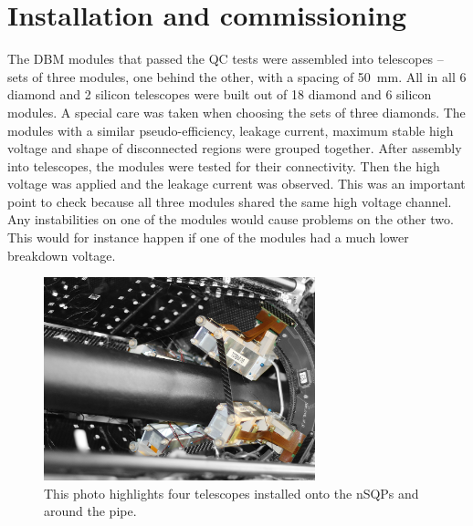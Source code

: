 \section{Installation and commissioning}
\label{sec:install}

The DBM modules that passed the QC tests were assembled into telescopes -- sets of three modules, one behind the other, with a spacing of 50~mm. All in all 6 diamond and 2 silicon telescopes were built out of 18 diamond and 6 silicon modules. A special care was taken when choosing the sets of three diamonds. The modules with a similar pseudo-efficiency, leakage current, maximum stable high voltage and shape of disconnected regions were grouped together. After assembly into telescopes, the modules were tested for their connectivity. Then the high voltage was applied and the leakage current was observed. This was an important point to check because all three modules shared the same high voltage channel. Any instabilities on one of the modules would cause problems on the other two. This would for instance happen if one of the modules had a much lower breakdown voltage.
\begin{figure}[!t]
\centering
\includegraphics[width=0.7\textwidth]{04_charge_monitoring/pics/DBM-installed-colour1}
\caption{This photo highlights four telescopes installed onto the nSQPs and around the pipe.}
\label{fig:dbminatlas}
\end{figure}

